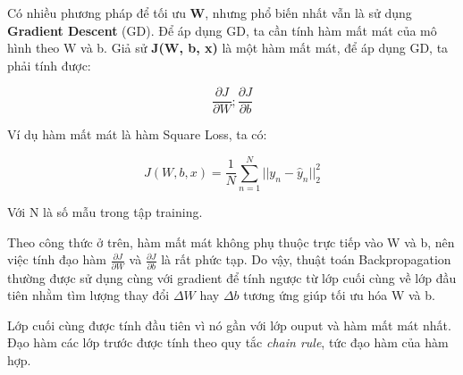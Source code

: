 Có nhiều phương pháp để tối ưu \textbf{W}, nhưng phổ biến nhất vẫn là sử dụng \textbf{Gradient Descent} (GD). Để áp dụng GD, ta cần tính hàm mất mát của mô hình theo W và b. Giả sử \textbf{J(W, b, x)} là một hàm mất mát, để áp dụng GD, ta phải tính được:
\begin{center}
	\begin{equation}
		\frac{\partial J}{\partial W};
		\frac{\partial J}{\partial b}
	\end{equation}
\end{center}
Ví dụ hàm mất mát là hàm Square Loss, ta có:
\begin{center}
	\begin{equation}
		J(W, b, x) = \frac{1}{N}\sum_{n=1}^N||y_n - \hat{y}_n||^2_2
	\end{equation}
\end{center}
Với N là số mẫu trong tập training.

Theo công thức ở trên, hàm mất mát không phụ thuộc trực tiếp vào W và b, nên việc tính đạo hàm \(\frac{\partial J}{\partial W}\) và \(\frac{\partial J}{\partial b}\) là rất phức tạp. Do vậy, thuật toán Backpropagation thường được sử dụng cùng với gradient để tính ngược từ lớp cuối cùng về lớp đầu tiên nhằm tìm lượng thay đổi \(\Delta W\) hay \(\Delta b\) tương ứng giúp tối ưu hóa W và b.

Lớp cuối cùng được tính đầu tiên vì nó gần với lớp ouput và hàm mất mát nhất. Đạo hàm các lớp trước được tính theo quy tắc \textit{chain rule}, tức đạo hàm của hàm hợp.


